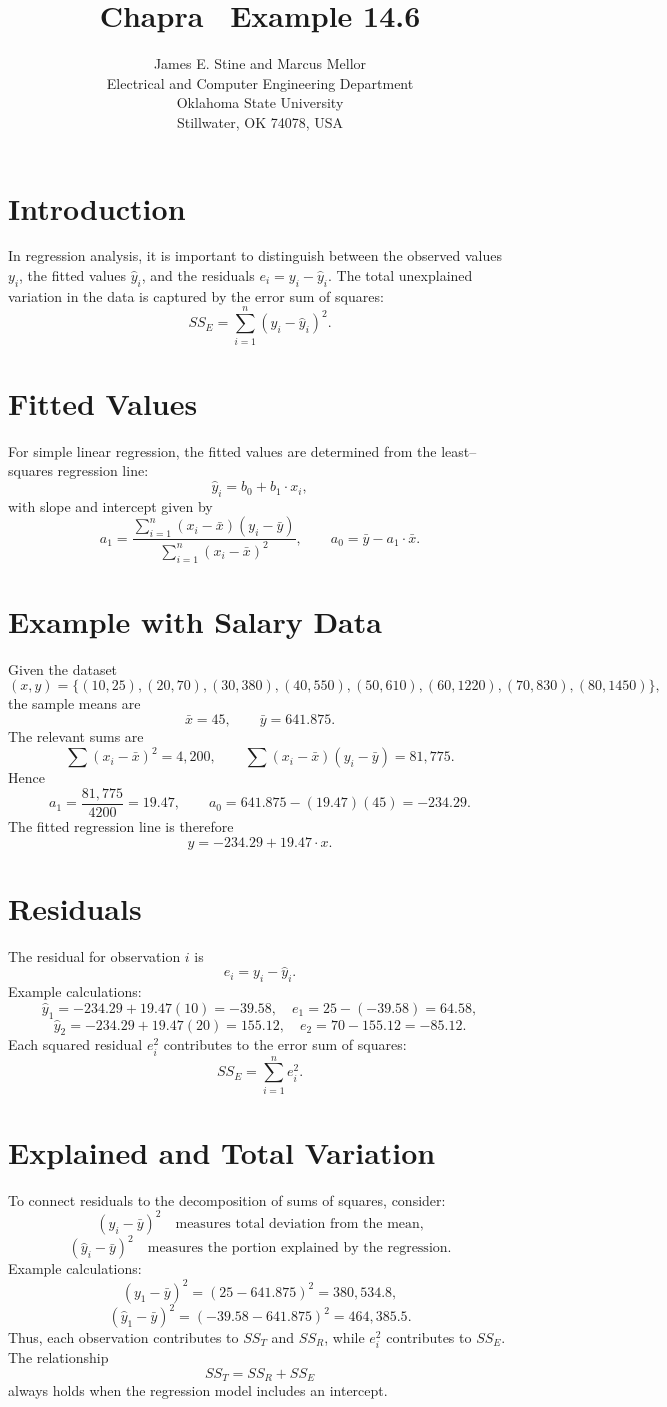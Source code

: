 \documentclass[10pt]{article}
\title{Chapra~\cite{chapra2023python} Example 14.6}
\author{James E. Stine and Marcus Mellor\\
Electrical and Computer Engineering Department\\
Oklahoma State University\\
Stillwater, OK 74078, USA}
\date{}
\date{}
\begin{document}
\maketitle

\section*{Introduction}
In regression analysis, it is important to distinguish between the observed values $y_i$, the fitted values $\hat{y}_i$, and the residuals $e_i = y_i - \hat{y}_i$. 
The total unexplained variation in the data is captured by the error sum of squares:
\[
SS_E = \sum_{i=1}^n (y_i - \hat{y}_i)^2.
\]

\section*{Fitted Values}
For simple linear regression, the fitted values are determined from the least--squares regression line:
\[
\hat{y}_i = b_0 + b_1 \cdot x_i,
\]
with slope and intercept given by
\[
a_1 = \frac{\sum_{i=1}^n (x_i - \bar{x})(y_i - \bar{y})}{\sum_{i=1}^n (x_i - \bar{x})^2},
\qquad
a_0 = \bar{y} - a_1 \cdot \bar{x}.
\]

\section*{Example with Salary Data}
Given the dataset
\[
(x,y) = \{(10,25),(20,70),(30,380),(40,550),(50,610),(60,1220),(70,830),(80,1450)\},
\]
the sample means are
\[
\bar{x} = 45, \qquad \bar{y} = 641.875.
\]
The relevant sums are
\[
\sum (x_i - \bar{x})^2 = 4{,}200, 
\qquad
\sum (x_i - \bar{x})(y_i - \bar{y}) = 81{,}775.
\]
Hence
\[
a_1 = \frac{81{,}775}{4200} = 19.47, 
\qquad
a_0 = 641.875 - (19.47)(45) = -234.29.
\]
The fitted regression line is therefore
\[
\hat{y} = -234.29 + 19.47 \cdot x.
\]

\section*{Residuals}
The residual for observation $i$ is
\[
e_i = y_i - \hat{y}_i.
\]
Example calculations:
\[
\hat{y}_1 = -234.29 + 19.47(10) = -39.58, 
\quad e_1 = 25 - (-39.58) = 64.58,
\]
\[
\hat{y}_2 = -234.29 + 19.47(20) = 155.12, 
\quad e_2 = 70 - 155.12 = -85.12.
\]
Each squared residual $e_i^2$ contributes to the error sum of squares:
\[
SS_E = \sum_{i=1}^n e_i^2.
\]

\section*{Explained and Total Variation}
To connect residuals to the decomposition of sums of squares, consider:
\[
(y_i - \bar{y})^2 \quad \text{measures total deviation from the mean,}
\]
\[
(\hat{y}_i - \bar{y})^2 \quad \text{measures the portion explained by the regression.}
\]
Example calculations:
\[
(y_1 - \bar{y})^2 = (25 - 641.875)^2 = 380{,}534.8,
\]
\[
(\hat{y}_1 - \bar{y})^2 = (-39.58 - 641.875)^2 = 464{,}385.5.
\]
Thus, each observation contributes to $SS_T$ and $SS_R$, while $e_i^2$ contributes to $SS_E$. The relationship
\[
SS_T = SS_R + SS_E
\]
always holds when the regression model includes an intercept.
\end{document}
